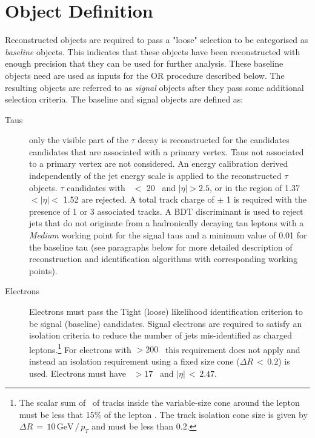 	\section{Object Definition}
	\label{sec:objdef}
	Reconstructed objects are required to pass a "loose" selection to be categorised as \textit{baseline} objects. 
	This indicates that these objects have been reconstructed with enough precision that they can be used for further analysis. 
	These baseline objects need are used as inputs for the \ac{OR} procedure described below.
	The resulting objects are referred to as \textit{signal} objects after  they pass some additional selection criteria.
	The baseline and signal objects are defined as:
	
	\begin{description}
	\item[Taus] only the visible part of the $\tau$ decay is reconstructed for the candidates candidates that are associated with a primary vertex. Taus not associated to a primary vertex are not considered.  
	An energy calibration derived independently of the jet energy scale is applied to the reconstructed $\tau$ objects.
	$\tau$ candidates with \pt\ $<$ 20 \gev\ and $|\eta|>2.5$, or in the region of 1.37 $<|\eta|<$ 1.52 are rejected. A total track charge of $\pm$ 1 is required with the presence of 1 or 3 associated tracks.  
	A \ac{BDT} discriminant is used to reject jets that do not originate from a hadronically decaying tau leptons with a \textit{Medium} working point for the signal taus and a minimum value of 0.01 for the baseline tau (see paragraphs below for more detailed description of reconstruction and identification algorithms with corresponding working points).
	\item[Electrons] Electrons must pass the Tight (loose) likelihood identification criterion to be signal (baseline) candidates. Signal electrons are required to satisfy an isolation criteria to reduce the number of jets mis-identified as charged leptons.\footnote{The scalar sum of \pt\ of tracks inside the variable-size cone around the lepton must be less that 15\% of the lepton \pt. The track isolation cone size is given by $\Delta R\, =\,10\, \mathrm{GeV}\, /\, p_T$ and must be less than 0.2.}  For electrons with \pt$>200$ \gev\ this requirement does not apply and instead an isolation requirement using a fixed size cone ($\Delta R\,<\,0.2 $) is used. Electrons must have \pt\ $>17$ \gev\ and $|\eta|\,<\,2.47$.

\end{description}
